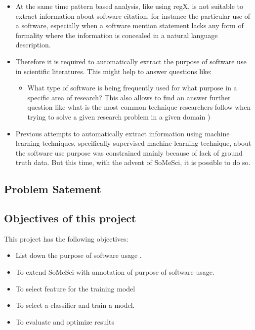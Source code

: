 \begin{itemize}
\begin{itemize}
			\end{itemize}

	\item At the same time pattern based analysis, like using regX, is not suitable to extract information about software citation, for instance the particular use of a software, especially when a software mention statement lacks any form of formality where the information is concealed in a natural language description. 
	\item Therefore it is required to automatically extract the purpose of software use in scientific literatures. This might help to answer questions like:
		
		\begin{itemize}
			\item What type of software is being frequently used for what purpose in a specific area of research? This also allows to find an answer further question like what is  the most common technique researchers follow when trying to solve a given research problem in a given domain )


		\end{itemize}	
	\item Previous attempts to automatically extract information using machine learning techniques, specifically supervised machine learning technique, about the software use purpose was constrained mainly because of lack of ground truth data. But this time, with the advent of SoMeSci, it is possible to do so. 	
	
\end{itemize}


\subsection{Problem Satement}
\subsection{Objectives of this project}
This project has the following objectives:
		
\begin{itemize}[noitemsep,topsep=5pt]   %

	\item List down the purpose of software usage .
	\item To extend SoMeSci with annotation of purpose of software usage. 
	\item To select feature for the training model
	\item To select a classifier and train a model.
	\item To evaluate and optimize results 

\end{itemize}	

\clearpage
